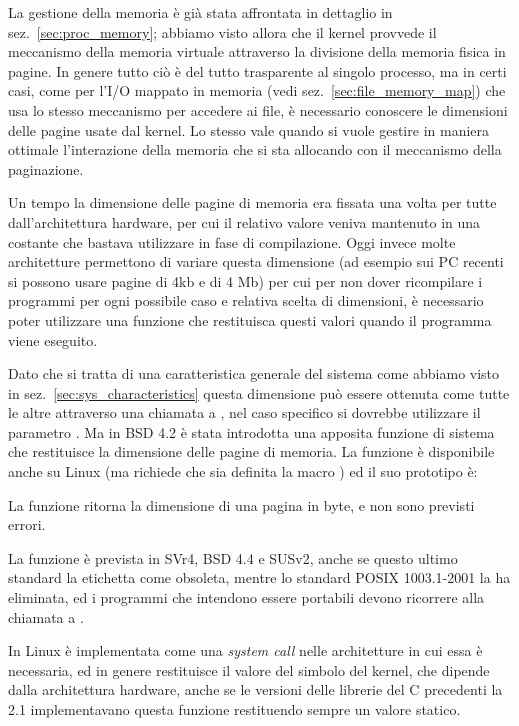 La gestione della memoria è già stata affrontata in dettaglio in
sez.~\ref{sec:proc_memory}; abbiamo visto allora che il kernel provvede il
meccanismo della memoria virtuale attraverso la divisione della memoria fisica
in pagine.  In genere tutto ciò è del tutto trasparente al singolo processo,
ma in certi casi, come per l'I/O mappato in memoria (vedi
sez.~\ref{sec:file_memory_map}) che usa lo stesso meccanismo per accedere ai
file, è necessario conoscere le dimensioni delle pagine usate dal kernel. Lo
stesso vale quando si vuole gestire in maniera ottimale l'interazione della
memoria che si sta allocando con il meccanismo della paginazione.

Un tempo la dimensione delle pagine di memoria era fissata una volta per tutte
dall'architettura hardware, per cui il relativo valore veniva mantenuto in una
costante che bastava utilizzare in fase di compilazione. Oggi invece molte
architetture permettono di variare questa dimensione (ad esempio sui PC
recenti si possono usare pagine di 4kb e di 4 Mb) per cui per non dover
ricompilare i programmi per ogni possibile caso e relativa scelta di
dimensioni, è necessario poter utilizzare una funzione che restituisca questi
valori quando il programma viene eseguito.

Dato che si tratta di una caratteristica generale del sistema come abbiamo
visto in sez.~\ref{sec:sys_characteristics} questa dimensione può essere
ottenuta come tutte le altre attraverso una chiamata a , nel
caso specifico si dovrebbe utilizzare il parametro . Ma
in BSD 4.2 è stata introdotta una apposita funzione di sistema
 che restituisce la dimensione delle pagine di memoria. La
funzione è disponibile anche su Linux (ma richiede che sia definita la macro
) ed il suo prototipo è:

\begin{funcproto}{
}

{La funzione ritorna la dimensione di una pagina in byte, e non sono previsti
  errori.}
\end{funcproto}

La funzione è prevista in SVr4, BSD 4.4 e SUSv2, anche se questo ultimo
standard la etichetta come obsoleta, mentre lo standard POSIX 1003.1-2001 la
ha eliminata, ed i programmi che intendono essere portabili devono ricorrere
alla chiamata a . 

In Linux è implementata come una \textit{system call} nelle architetture in
cui essa è necessaria, ed in genere restituisce il valore del simbolo
 del kernel, che dipende dalla architettura hardware, anche
se le versioni delle librerie del C precedenti la  2.1
implementavano questa funzione restituendo sempre un valore statico.

